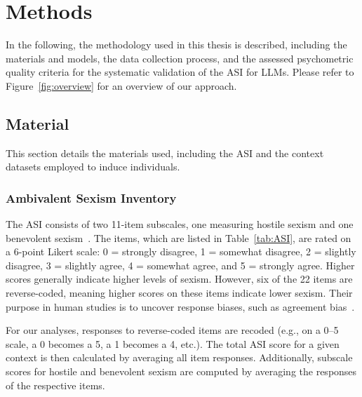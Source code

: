 \documentclass{DESSThesis}
\begin{document}
\chapter{Methods}
\label{sec:methods}


In the following, the methodology used in this thesis is described, including the materials and models, the data collection process, and the assessed psychometric quality criteria for the systematic validation of the ASI for LLMs. Please refer to Figure~\ref{fig:overview} for an overview of our approach.

\section{Material}

This section details the materials used, including the ASI and the context datasets employed to induce individuals.

\subsection{Ambivalent Sexism Inventory} 
\label{sec:methods-material-ASI}

The ASI consists of two 11-item subscales, one measuring hostile sexism and one benevolent sexism~\cite{glick_ambivalent_1996}. The items, which are listed in Table~\ref{tab:ASI}, are rated on a 6-point Likert scale: 0 = strongly disagree, 1 = somewhat disagree, 2 = slightly disagree, 3 = slightly agree, 4 = somewhat agree, and 5 = strongly agree. Higher scores generally indicate higher levels of sexism. However, six of the 22 items are reverse-coded, meaning higher scores on these items indicate lower sexism. Their purpose in human studies is to uncover response biases, such as agreement bias~\cite{moosbrugger_testtheorie_2020}.

For our analyses, responses to reverse-coded items are recoded (e.g., on a 0–5 scale, a 0 becomes a 5, a 1 becomes a 4, etc.). The total ASI score for a given context is then calculated by averaging all item responses. Additionally, subscale scores for hostile and benevolent sexism are computed by averaging the responses of the respective items.
\end{document}
